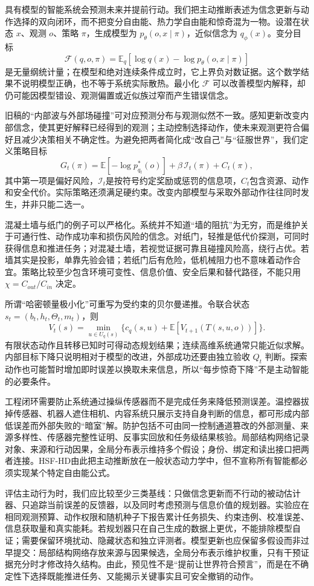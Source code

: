 具有模型的智能系统会预测未来并提前行动。我们把主动推断表述为信念更新与动作选择的双向闭环，而不把变分自由能、热力学自由能和惊奇混为一物。设潜在状态 $x$、观测 $o$、策略 $\pi$，生成模型为 $p_\theta(o,x\mid\pi)$，近似信念为 $q_\phi(x)$。变分目标
\[
 \mathcal F(q,o,\pi)=\mathbb E_q[\log q(x)-\log p_\theta(o,x\mid\pi)]
\]
是无量纲统计量；在模型和绝对连续条件成立时，它上界负对数证据。这个数学结果不说明模型正确，也不等于系统实际散热。最小化 $\mathcal F$ 可以改善模型内解释，却仍可能因模型错设、观测偏置或近似族过窄而产生错误信念。

旧稿的“内部波与外部场碰撞”可对应预测分布与观测似然不一致。感知更新改变内部信念，使其更好解释已经得到的观测；主动控制选择动作，使未来观测更符合偏好且减少决策相关不确定性。为避免把两者简化成“改自己”与“征服世界”，我们定义策略目标
\[
 G_t(\pi)=\mathbb E[-\log p^*_{q_t}(o)]+\beta\,\mathcal I_t(\pi)+C_t(\pi),
\]
其中第一项是偏好风险，$\mathcal I_t$是按符号约定奖励或惩罚的信息项，$C_t$包含资源、动作和安全代价。实际策略还须满足硬约束。改变内部模型与采取外部动作往往同时发生，并非只能二选一。

混凝土墙与纸门的例子可以严格化。系统并不知道“墙的阻抗”为无穷，而是维护关于可通行性、动作成功率和损伤风险的信念。对纸门，轻推是低代价探测，可同时获得信息和推进任务；对混凝土墙，若视觉证据可靠且碰撞风险高，绕行占优。若墙其实是投影，单靠先验会错；若纸门后有危险，低机械阻力也不意味着动作合宜。策略比较至少包含环境可变性、信息价值、安全后果和替代路径，不能只用 $\chi=C_{out}/C_{in}$ 决定。

所谓“哈密顿量极小化”可重写为受约束的贝尔曼递推。令联合状态 $s_t=(b_t,h_t,\Theta_t,m_t)$，则
\[
 V_t(s)=\min_{u\in U_q(s)}\{c_q(s,u)+\mathbb E[V_{t+1}(T(s,u,o))]\}.
\]
有限状态动作且转移已知时可得动态规划结果；连续高维系统通常只能近似求解。内部目标下降只说明相对于模型的改进，外部成功还要由独立验收 $Q_t$ 判断。探索动作也可能暂时增加即时误差以换取未来信息，所以“每步惊奇下降”不是主动智能的必要条件。

工程闭环需要防止系统通过操纵传感器而不是完成任务来降低预测误差。温控器拔掉传感器、机器人遮住相机、内容系统只展示支持自身判断的信息，都可形成内部低误差而外部失败的“暗室”解。防护包括不可由同一控制通道篡改的外部测量、来源多样性、传感器完整性证明、反事实回放和任务级结果核验。局部结构网络记录对象、来源和行动因果，全局分布表示维持多个假设；身份、绑定和读出接口把两者连接。HSF-HD由此把主动推断放在一般状态动力学中，但不宣称所有智能都必须实现某个特定自由能公式。

评估主动行为时，我们应比较至少三类基线：只做信念更新而不行动的被动估计器、只追踪当前误差的反馈器，以及同时考虑预测与信息价值的规划器。实验应在相同观测预算、动作权限和随机种子下报告累计任务损失、约束违例、校准误差、信息获取量和真实能耗。若规划器只在自己生成的数据上更优，不能排除模型自证；需要保留环境扰动、隐藏状态和独立评测者。模型更新也应保留多假设而非过早提交：局部结构网络存放来源与因果候选，全局分布表示维护权重，只有干预证据充分时才修改持久结构。由此，预见性不是“提前让世界符合预言”，而是在不确定性下选择既能推进任务、又能揭示关键事实且可安全撤销的动作。


